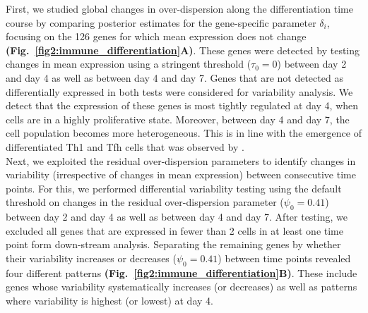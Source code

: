 First, we studied global changes in over-dispersion along the differentiation time course by comparing posterior estimates for the gene-specific parameter $\delta_i$, focusing on the 126 genes for which mean expression does not change \textbf{(Fig.~\ref{fig2:immune_differentiation}A)}. These genes were detected by testing changes in mean expression using a stringent threshold ($\tau_0=0$) between day 2 and day 4 as well as between day 4 and day 7. Genes that are not detected as differentially expressed in both tests were considered for variability analysis. We detect that the expression of these genes is most tightly regulated at day 4, when cells are in a highly proliferative state. Moreover, between day 4 and day 7, the cell population becomes more heterogeneous. This is in line with the emergence of differentiated Th1 and Tfh cells that was observed by \cite{Lonnberg2017}. \\

Next, we exploited the residual over-dispersion parameters to identify changes in variability (irrespective of changes in mean expression) between consecutive time points. For this, we performed differential variability testing using the default threshold on changes in the residual over-dispersion parameter ($\psi_0 = 0.41$) between day 2 and day 4 as well as between day 4 and day 7. After testing, we excluded all genes that are expressed in fewer than 2 cells in at least one time point form down-stream analysis. Separating the remaining genes by whether their variability increases or decreases ($\psi_0 = 0.41$) between time points revealed four different patterns \textbf{(Fig.~\ref{fig2:immune_differentiation}B)}. These include genes whose variability systematically increases (or decreases) as well as patterns where variability is highest (or lowest) at day 4. 

\newpage

